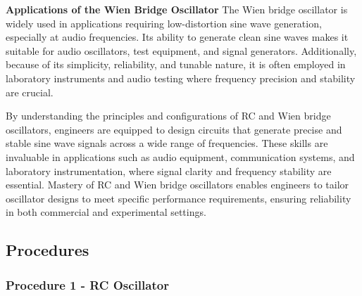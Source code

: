 \documentclass[12pt,a4paper]{article}
\begin{document}
    \textbf{Applications of the Wien Bridge Oscillator}
    The Wien bridge oscillator is widely used in applications requiring low-distortion sine wave generation, especially at audio frequencies. Its ability to generate clean sine waves makes it suitable for audio oscillators, test equipment, and signal generators. Additionally, because of its simplicity, reliability, and tunable nature, it is often employed in laboratory instruments and audio testing where frequency precision and stability are crucial.

    By understanding the principles and configurations of RC and Wien bridge oscillators, engineers are equipped to design circuits that generate precise and stable sine wave signals across a wide range of frequencies. These skills are invaluable in applications such as audio equipment, communication systems, and laboratory instrumentation, where signal clarity and frequency stability are essential. Mastery of RC and Wien bridge oscillators enables engineers to tailor oscillator designs to meet specific performance requirements, ensuring reliability in both commercial and experimental settings.


    \subsection{Procedures}

    \subsubsection{Procedure 1 - RC Oscillator}
\end{document}
